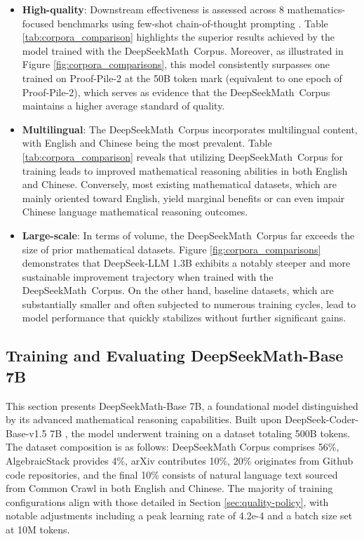 \begin{itemize}[topsep=0pt]
\begin{itemize}[topsep=0pt]
    \item \textbf{High-quality}:
    Downstream effectiveness is assessed across 8 mathematics-focused benchmarks using few-shot chain-of-thought prompting \cite{cot}. Table \ref{tab:corpora_comparison} highlights the superior results achieved by the model trained with the DeepSeekMath~Corpus. Moreover, as illustrated in Figure \ref{fig:corpora_comparisons}, this model consistently surpasses one trained on Proof-Pile-2 at the 50B token mark (equivalent to one epoch of Proof-Pile-2), which serves as evidence that the DeepSeekMath~Corpus maintains a higher average standard of quality.
    \item \textbf{Multilingual}:
    The DeepSeekMath~Corpus incorporates multilingual content, with English and Chinese being the most prevalent. Table \ref{tab:corpora_comparison} reveals that utilizing DeepSeekMath~Corpus for training leads to improved mathematical reasoning abilities in both English and Chinese. Conversely, most existing mathematical datasets, which are mainly oriented toward English, yield marginal benefits or can even impair Chinese language mathematical reasoning outcomes.
    \item \textbf{Large-scale}:
    In terms of volume, the DeepSeekMath~Corpus far exceeds the size of prior mathematical datasets. Figure \ref{fig:corpora_comparisons} demonstrates that DeepSeek-LLM 1.3B exhibits a notably steeper and more sustainable improvement trajectory when trained with the DeepSeekMath~Corpus. On the other hand, baseline datasets, which are substantially smaller and often subjected to numerous training cycles, lead to model performance that quickly stabilizes without further significant gains.
\end{itemize}

\subsection{Training and Evaluating DeepSeekMath-Base 7B}

This section presents DeepSeekMath-Base 7B, a foundational model distinguished by its advanced mathematical reasoning capabilities. Built upon DeepSeek-Coder-Base-v1.5 7B \citep{deepseek-coder}, the model underwent training on a dataset totaling 500B tokens. The dataset composition is as follows: DeepSeekMath Corpus comprises 56\%, AlgebraicStack provides 4\%, arXiv contributes 10\%, 20\% originates from Github code repositories, and the final 10\% consists of natural language text sourced from Common Crawl in both English and Chinese. The majority of training configurations align with those detailed in Section \ref{sec:quality-policy}, with notable adjustments including a peak learning rate of 4.2e-4 and a batch size set at 10M tokens.


\end{itemize}
